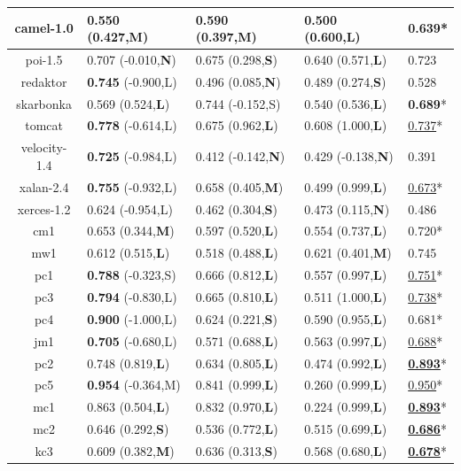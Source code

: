 \begin{table}[!t]
\begin{tabular}{|@{}c@{}||@{}C{21mm}@{}|@{}C{21mm}@{}|@{}C{21mm}@{}||@{}C{8mm}@{}|}
camel-1.0	&0.550 (0.427,{\bf M})	&0.590 (0.397,{\bf M})	&0.500 (0.600,{\bf L})	&0.639* \\ \hline
poi-1.5	&0.707 (-0.010,{\bf N})	&0.675 (0.298,{\bf S})	&0.640 (0.571,{\bf L})	&0.723 \\ \hline
redaktor	&{\bf 0.745} (-0.900,L)	&0.496 (0.085,{\bf N})	&0.489 (0.274,{\bf S})	&0.528 \\ \hline
skarbonka	&0.569 (0.524,{\bf L})	&0.744 (-0.152,S)	&0.540 (0.536,{\bf L})	&{\bf 0.689}* \\ \hline
tomcat	&{\bf 0.778} (-0.614,L)	&0.675 (0.962,{\bf L})	&0.608 (1.000,{\bf L})	&\underline{0.737}* \\ \hline
velocity-1.4	&{\bf 0.725} (-0.984,L)	&0.412 (-0.142,{\bf N})	&0.429 (-0.138,{\bf N})	&0.391 \\ \hline
xalan-2.4	&{\bf 0.755} (-0.932,L)	&0.658 (0.405,{\bf M})	&0.499 (0.999,{\bf L})	&\underline{0.673}* \\ \hline
xerces-1.2	&0.624 (-0.954,L)	&0.462 (0.304,{\bf S})	&0.473 (0.115,{\bf N})	&0.486 \\ \hline
cm1	&0.653 (0.344,{\bf M})	&0.597 (0.520,{\bf L})	&0.554 (0.737,{\bf L})	&0.720* \\ \hline
mw1	&0.612 (0.515,{\bf L})	&0.518 (0.488,{\bf L})	&0.621 (0.401,{\bf M})	&0.745 \\ \hline
pc1	&{\bf 0.788} (-0.323,S)	&0.666 (0.812,{\bf L})	&0.557 (0.997,{\bf L})	&\underline{0.751}* \\ \hline
pc3	&{\bf 0.794} (-0.830,L)	&0.665 (0.810,{\bf L})	&0.511 (1.000,{\bf L})	&\underline{0.738}* \\ \hline
pc4	&{\bf 0.900} (-1.000,L)	&0.624 (0.221,{\bf S})	&0.590 (0.955,{\bf L})	&0.681* \\ \hline
jm1	&{\bf 0.705} (-0.680,L)	&0.571 (0.688,{\bf L})	&0.563 (0.997,{\bf L})	&\underline{0.688}* \\ \hline
pc2	&0.748 (0.819,{\bf L})	&0.634 (0.805,{\bf L})	&0.474 (0.992,{\bf L})	&\underline{{\bf 0.893}}* \\ \hline
pc5	&{\bf 0.954} (-0.364,M)	&0.841 (0.999,{\bf L})	&0.260 (0.999,{\bf L})	&\underline{0.950}* \\ \hline
mc1	&0.863 (0.504,{\bf L})	&0.832 (0.970,{\bf L})	&0.224 (0.999,{\bf L})	&\underline{{\bf 0.893}}* \\ \hline
mc2	&0.646 (0.292,{\bf S})	&0.536 (0.772,{\bf L})	&0.515 (0.699,{\bf L})	&\underline{{\bf 0.686}}* \\ \hline
kc3	&0.609 (0.382,{\bf M})	&0.636 (0.313,{\bf S})	&0.568 (0.680,{\bf L})	&\underline{{\bf 0.678}}* \\ \hline

\end{tabular}
\end{table}
